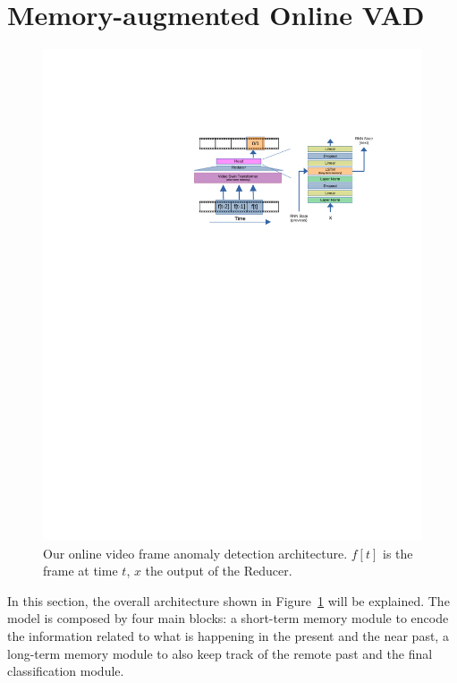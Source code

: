 \section{Memory-augmented Online VAD}
\label{sec:theory}

\fboxsep=1mm%
\fboxrule=1pt%

\begin{figure}[!ht]
	\centering
            \includegraphics[trim=205 500 80 130, clip, width=1.\linewidth]{images/arch.pdf}
        \caption{Our online video frame anomaly detection architecture. $f[t]$ is the frame at time $t$, $x$ the output of the Reducer.}
		\label{fig:arch}
\end{figure}

In this section, the overall architecture shown in Figure~\ref{fig:arch} will be explained.
The model is composed by four main blocks: a short-term memory module to encode the information related to what is happening in the present and the near past, a long-term memory module to also keep track of the remote past and the final classification module. 

